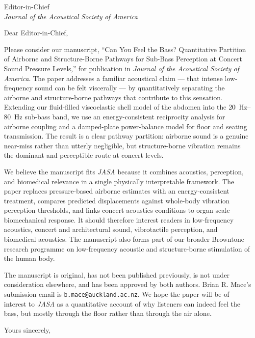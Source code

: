 \documentclass[11pt]{letter}
\date{\today}
\begin{document}
\begin{letter}{%
Editor-in-Chief\\
\textit{Journal of the Acoustical Society of America}}

\opening{Dear Editor-in-Chief,}
\small

Please consider our manuscript, ``Can You Feel the Bass? Quantitative Partition of Airborne and Structure-Borne Pathways for Sub-Bass Perception at Concert Sound Pressure Levels,'' for publication in \textit{Journal of the Acoustical Society of America}. The paper addresses a familiar acoustical claim --- that intense low-frequency sound can be felt viscerally --- by quantitatively separating the airborne and structure-borne pathways that contribute to this sensation. Extending our fluid-filled viscoelastic shell model of the abdomen into the \SIrange{20}{80}{\hertz} sub-bass band, we use an energy-consistent reciprocity analysis for airborne coupling and a damped-plate power-balance model for floor and seating transmission. The result is a clear pathway partition: airborne sound is a genuine near-miss rather than utterly negligible, but structure-borne vibration remains the dominant and perceptible route at concert levels.

We believe the manuscript fits \textit{JASA} because it combines acoustics, perception, and biomedical relevance in a single physically interpretable framework. The paper replaces pressure-based airborne estimates with an energy-consistent treatment, compares predicted displacements against whole-body vibration perception thresholds, and links concert-acoustics conditions to organ-scale biomechanical response. It should therefore interest readers in low-frequency acoustics, concert and architectural sound, vibrotactile perception, and biomedical acoustics. The manuscript also forms part of our broader Browntone research programme on low-frequency acoustic and structure-borne stimulation of the human body.

The manuscript is original, has not been published previously, is not under consideration elsewhere, and has been approved by both authors. Brian R. Mace's submission email is \texttt{b.mace@auckland.ac.nz}. We hope the paper will be of interest to \textit{JASA} as a quantitative account of why listeners can indeed feel the bass, but mostly through the floor rather than through the air alone.

\closing{Yours sincerely,}

\end{letter}
\end{document}
